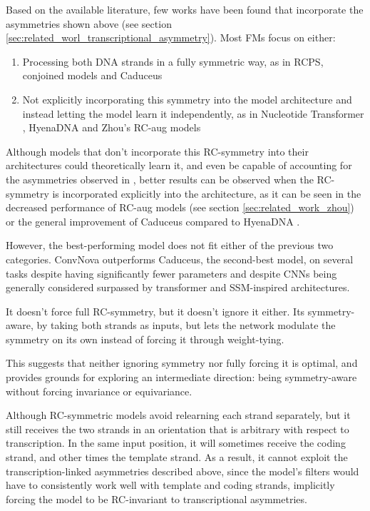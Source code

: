 \documentclass[   ]{article}
\begin{document}
Based on the available literature, few works have been found that incorporate the asymmetries shown above (see section \ref{sec:related_worl_transcriptional_asymmetry}). Most FMs focus on either:
\begin{enumerate}[label=\alph*]
	\item Processing both DNA strands in
	a fully symmetric way, as in RCPS, conjoined models
	\citep{zhouBetterUnderstandingReverseComplement2021} and Caduceus
	\citep{schiffCaduceusBiDirectionalEquivariant2024}
	\item Not explicitly incorporating this symmetry into the model architecture and instead letting the model learn it independently, as in Nucleotide Transformer
	\citep{dalla-torreNucleotideTransformerBuilding2025}, HyenaDNA
	\citep{nguyenHyenaDNALongRangeGenomic2023} and Zhou's RC-aug models
	\citep{zhouBetterUnderstandingReverseComplement2021}
\end{enumerate}

Although models that don't incorporate this RC-symmetry into their architectures could
theoretically learn it, and even be capable of accounting for the
asymmetries observed in \citet{moeckelStrandAsymmetriesGenomic2023}, better results can be observed when the RC-symmetry is incorporated explicitly into the architecture, as it can be seen in the decreased performance of \citet{zhouBetterUnderstandingReverseComplement2021} RC-aug models (see section \ref{sec:related_work_zhou}) or the general improvement of Caduceus compared to HyenaDNA \citep{schiffCaduceusBiDirectionalEquivariant2024}.

However, the best-performing model does not fit either of the previous two categories. ConvNova outperforms Caduceus, the second-best model, on several tasks despite having significantly fewer parameters\citep{boRevisitingConvolutionArchitecture2025} and despite CNNs being generally considered surpassed by transformer and SSM-inspired architectures. 

It doesn't force full RC-symmetry, but it doesn't ignore it either. Its symmetry-aware, by taking both strands as inputs, but lets the network modulate the symmetry on its own instead of forcing it through weight-tying.

This
suggests that neither ignoring symmetry nor fully forcing it is optimal, and provides grounds for exploring an intermediate direction: being symmetry-aware without forcing invariance or equivariance.

Although RC-symmetric models avoid relearning each strand separately, but it still receives the two strands in an orientation that is arbitrary with respect to transcription. In the same input position, it will sometimes receive the coding strand, and other times the template strand. As a result, it cannot exploit the transcription-linked asymmetries described above, since the model's filters would have to consistently work well with template and coding strands, implicitly forcing the model to be RC-invariant to transcriptional asymmetries.
\end{document}
